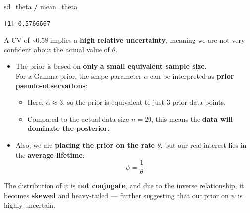 \documentclass[
]{article}
\newenvironment{Shaded}{\begin{snugshade}}{\end{snugshade}}
\newcommand{\NormalTok}[1]{#1}
\newcommand{\SpecialCharTok}[1]{\textcolor[rgb]{0.81,0.36,0.00}{\textbf{#1}}}
\providecommand{\tightlist}{%
  \setlength{\itemsep}{0pt}\setlength{\parskip}{0pt}}
\begin{document}
\begin{Shaded}
\begin{Highlighting}[]
\NormalTok{sd\_theta }\SpecialCharTok{/}\NormalTok{ mean\_theta}
\end{Highlighting}
\end{Shaded}

\begin{verbatim}
[1] 0.5766667
\end{verbatim}

A CV of \textasciitilde0.58 implies a \textbf{high relative
uncertainty}, meaning we are not very confident about the actual value
of \(\theta\).

\begin{itemize}
\tightlist
\item
  The prior is based on \textbf{only a small equivalent sample size}.\\
  For a Gamma prior, the shape parameter \(\alpha\) can be interpreted
  as \textbf{prior pseudo-observations}:

  \begin{itemize}
  \tightlist
  \item
    Here, \(\alpha \approx 3\), so the prior is equivalent to just 3
    prior data points.
  \item
    Compared to the actual data size \(n = 20\), this means the
    \textbf{data will dominate the posterior}.
  \end{itemize}
\item
  Also, we are \textbf{placing the prior on the rate \(\theta\)}, but
  our real interest lies in the \textbf{average lifetime}: \[
  \psi = \frac{1}{\theta}
  \]
\end{itemize}

The distribution of \(\psi\) is \textbf{not conjugate}, and due to the
inverse relationship, it becomes \textbf{skewed} and heavy-tailed ---
further suggesting that our prior on \(\psi\) is highly uncertain.
\end{document}
